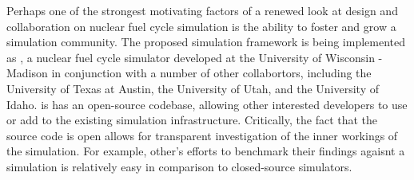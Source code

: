 Perhaps one of the strongest motivating factors of a renewed look at design and
collaboration on nuclear fuel cycle simulation is the ability to foster and grow
a simulation community. The proposed simulation framework is being implemented
as \Cyclus \cite{cyclus2012}, a nuclear fuel cycle simulator developed at the
University of Wisconsin - Madison in conjunction with a number of other
collabortors, including the University of Texas at Austin, the University of
Utah, and the University of Idaho. \Cyclus is has an open-source codebase,
allowing other interested developers to use or add to the existing simulation
infrastructure. Critically, the fact that the source code is open allows for
transparent investigation of the inner workings of the simulation. For example,
other's efforts to benchmark their findings agaisnt a \Cyclus simulation is
relatively easy in comparison to closed-source simulators. 
